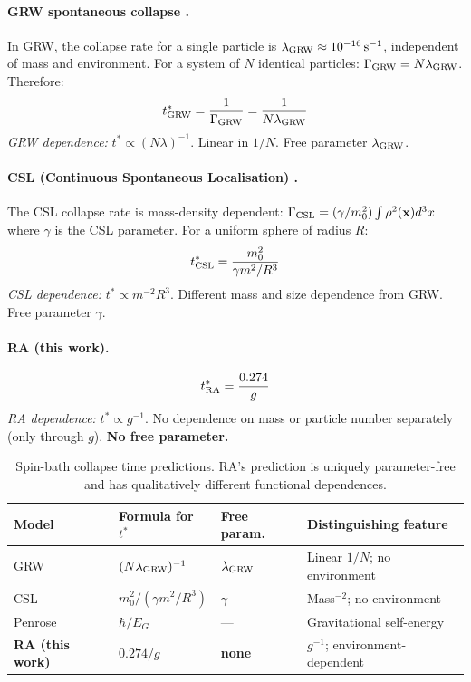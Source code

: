 \documentclass[12pt,a4paper]{article}
\begin{document}
\paragraph{GRW spontaneous collapse \cite{GRW1986}.}
In GRW, the collapse rate for a single particle is $\lambda_{\rm GRW}\approx10^{-16}\,\mathrm{s}^{-1}$, independent of mass and environment.  For a system of $N$ identical particles: $\Gamma_{\rm GRW}=N\lambda_{\rm GRW}$.  Therefore:
\begin{equation}
  t^*_{\rm GRW} = \frac{1}{\Gamma_{\rm GRW}} = \frac{1}{N\lambda_{\rm GRW}}
\end{equation}
\textit{GRW dependence:} $t^*\propto(N\lambda)^{-1}$.  Linear in $1/N$.  Free parameter $\lambda_{\rm GRW}$.

\paragraph{CSL (Continuous Spontaneous Localisation) \cite{Bassi2003}.}
The CSL collapse rate is mass-density dependent: $\Gamma_{\rm CSL}=(\gamma/m_0^2)\int\rho^2(\mathbf{x})d^3x$ where $\gamma$ is the CSL parameter.  For a uniform sphere of radius $R$:
\begin{equation}
  t^*_{\rm CSL} = \frac{m_0^2}{\gamma m^2/R^3}
\end{equation}
\textit{CSL dependence:} $t^*\propto m^{-2}R^3$.  Different mass and size dependence from GRW.  Free parameter $\gamma$.

\paragraph{RA (this work).}
\begin{equation}
  t^*_{\rm RA} = \frac{0.274}{g}
  \label{eq:RA_spinbath}
\end{equation}
\textit{RA dependence:} $t^*\propto g^{-1}$.  No dependence on mass or particle number separately (only through $g$).  \textbf{No free parameter.}

\begin{table}[ht]
\centering
\caption{Spin-bath collapse time predictions.  RA's prediction is uniquely parameter-free and has qualitatively different functional dependences.}
\label{tab:collapse_compare}
\begin{tabular}{lllp{4.5cm}}
\toprule
Model & Formula for $t^*$ & Free param. & Distinguishing feature \\
\midrule
GRW \cite{GRW1986} & $(N\lambda_{\rm GRW})^{-1}$ & $\lambda_{\rm GRW}$ & Linear $1/N$; no environment \\
CSL \cite{Bassi2003} & $m_0^2/(\gamma m^2/R^3)$ & $\gamma$ & Mass$^{-2}$; no environment \\
Penrose \cite{Penrose1996} & $\hbar/E_G$ & --- & Gravitational self-energy \\
\textbf{RA (this work)} & $0.274/g$ & \textbf{none} & $g^{-1}$; environment-dependent \\
\bottomrule
\end{tabular}
\end{table}
\end{document}
